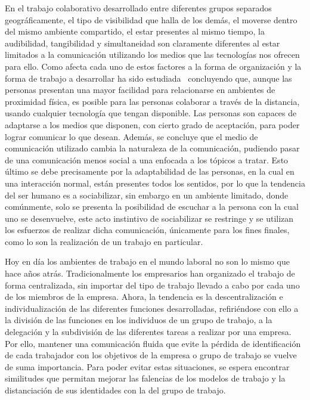 En el trabajo colaborativo desarrollado entre diferentes grupos separados
geográficamente, el tipo de visibilidad que halla de los demás, el moverse
dentro del mismo ambiente compartido, el estar presentes al mismo tiempo, la
audibilidad, tangibilidad y simultaneidad son claramente diferentes al estar
limitados a la comunicación utilizando los medios que las tecnologías nos
ofrecen para ello. Como afecta cada uno de estos factores a la forma de
organización y la forma de trabajo a desarrollar ha sido
estudiada~\cite{proximity_collaboration} concluyendo que, aunque las personas
presentan una mayor facilidad para relacionarse en ambientes de proximidad
física, es posible para las personas colaborar a través de la distancia,
usando cualquier tecnología que tengan disponible. Las personas son capaces de
adaptarse a los medios que disponen, con cierto grado de aceptación, para poder
lograr comunicar lo que desean. Además, se concluye que el medio de
comunicación utilizado cambia la naturaleza de la comunicación, pudiendo 
pasar de una comunicación menos social a una enfocada a los tópicos a tratar.
Esto último se debe precisamente por la adaptabilidad de las personas, en la 
cual en una interacción normal, están presentes todos los sentidos, por lo que 
la tendencia del ser humano es a sociabilizar, sin embargo en un ambiente 
limitado, donde comúnmente, solo se presenta la posibilidad
de escuchar a la persona con la cual uno se desenvuelve, este acto instintivo de 
sociabilizar se restringe y se utilizan los esfuerzos de realizar dicha comunicación, 
únicamente para los fines finales, como lo son la realización de un trabajo en particular.

Hoy en día los ambientes de trabajo en el mundo laboral no son lo mismo que
hace años atrás. Tradicionalmente los empresarios han organizado el trabajo de
forma centralizada, sin importar del tipo de trabajo llevado a cabo por cada
uno de los miembros de la empresa. Ahora, la tendencia es la descentralización
e individualización de las diferentes funciones desarrolladas, refiriéndose
con ello a la división de las funciones en los individuos de un grupo de
trabajo, a la delegación y la subdivisión de las diferentes tareas a
realizar por una empresa.
Por ello, mantener una comunicación fluida que evite la pérdida de
identificación de cada trabajador con los objetivos de la empresa o grupo de
trabajo se vuelve de suma importancia.
Para poder evitar estas situaciones, se espera encontrar similitudes que
permitan mejorar las falencias de los modelos de trabajo y la distanciación de
sus identidades con la del grupo de trabajo\cite{trabajo_flexible}.

